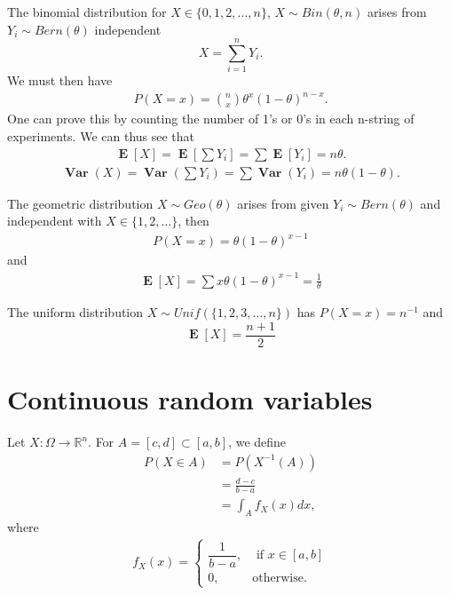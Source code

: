 \documentclass{article}
\theoremstyle{problemstyle}
\newcommand{\R}{\mathbb R}
\DeclareMathOperator{\Var}{\mathbf{Var}}
\DeclareMathOperator{\E}{\mathbf{E}}
\begin{document}
\begin{example}[Binomial]
  The binomial distribution for $ X \in \{0,1,2,\dots,n\} $, $ X\sim Bin(\theta, n) $ arises from $ Y_i\sim Bern(\theta) $ independent
  \[
    X = \sum_{i=1}^n Y_i.
  \]
  We must then have
  \begin{align*}
    P(X=x) = {n\choose x} \theta^x (1-\theta)^{n-x}.
  \end{align*}
  One can prove this by counting the number of 1's or 0's in each n-string of experiments. We can thus see that
  \begin{align*}
    \E[X] = \E\left[\sum Y_i\right] = \sum \E[Y_i] = n\theta.
  \end{align*}
  \begin{align}
    \Var(X) = \Var(\sum Y_i) = \sum \Var(Y_i) = n\theta(1-\theta).
  \end{align}
\end{example}

\begin{example}[Geometric]
  The geometric distribution $ X\sim Geo(\theta) $ arises from given $ Y_i \sim Bern(\theta) $ and independent with $ X\in \{1,2,\dots\} $, then
  \begin{align}
    P(X=x) = \theta(1-\theta)^{x-1}
  \end{align}
  and 
  \begin{align*}
    \E[X] = \sum x \theta(1-\theta)^{x-1} = \frac{1}{\theta}
  \end{align*}
  
\end{example}

\begin{example}[Uniform]
  The uniform distribution $ X\sim Unif(\{1,2,3,\dots, n\}) $ has $ P(X=x) = n^{-1} $ and
  \[
    \E[X] = \displaystyle\frac{n+1}{2}
  \]
\end{example}



\section{Continuous random variables}\label{sec:continuous_random_variables} %

Let $ X:\Omega \to \R^n $. For $ A = [c,d]\subset [a,b] $, we define
\begin{align*}
  P(X\in A) &= P(X^{-1}(A))\\ 
            &= \frac{d-c}{b-a}\\ 
            &= \int_{A} f_X(x)dx,
\end{align*}
where 
\begin{align*}
  f_X(x) = \begin{cases}
    \dfrac{1}{b-a}, &\text{ if }x\in[a,b]\\
    0, &\text{otherwise}.
  \end{cases}
\end{align*}
\end{document}
